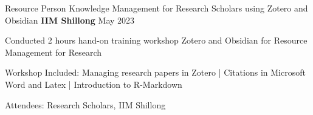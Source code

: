 \begin{cventries}
\cventry
{Resource Person} %
{Knowledge Management for Research Scholars using Zotero and Obsidian} %
{\textbf{IIM Shillong}} %
{May 2023} %
{ %
\begin{cvitems}
\item {Conducted 2 hours hand-on training workshop Zotero and Obsidian for Resource Management for Research}
\item {Workshop Included: Managing research papers in Zotero | Citations in Microsoft Word and Latex | Introduction to R-Markdown}
\item {Attendees: Research Scholars, IIM Shillong}
\end{cvitems}
}

\end{cventries}